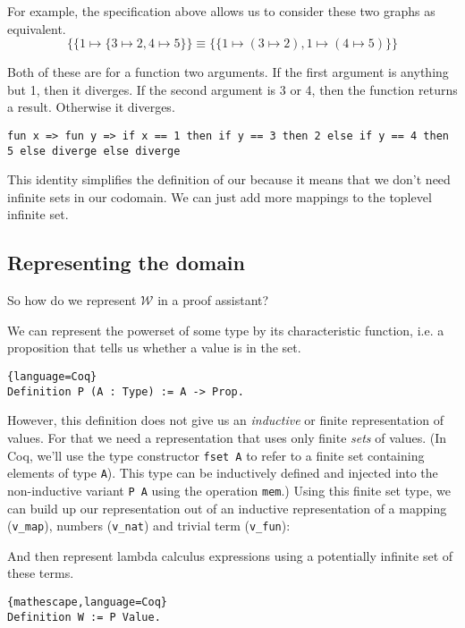 \documentclass{article}
\theoremstyle{definition}
\newcommand{\codeplus}[3]{%
  }
\begin{document}
For example, the specification above allows us to consider these two graphs as
equivalent. 
\[
\{ \{1 \mapsto \{ 3 \mapsto 2, 4 \mapsto 5 \} \}
\equiv
\{ \{ 1 \mapsto (3 \mapsto 2), 1 \mapsto (4 \mapsto 5) \} \}
\]

Both of these are for a function two arguments. If the first
argument is anything but 1, then it diverges. If the second argument is 3 or
4, then the function returns a result. Otherwise it diverges.

\begin{verbatim}
fun x => fun y => if x == 1 then if y == 3 then 2 else if y == 4 then 5 else diverge else diverge
\end{verbatim}


This identity simplifies the definition of our because it means that we don't
need infinite sets in our codomain. We can just add more mappings to the
toplevel infinite set.

\subsection{Representing the domain}

So how do we represent $\mathcal{W}$ in a proof assistant?

We can represent the powerset of some type by its characteristic function,
i.e. a proposition that tells us whether a value is in the set.

\begin{lstlisting}{language=Coq}
Definition P (A : Type) := A -> Prop.
\end{lstlisting}

However, this definition does not give us an \emph{inductive} or finite
representation of values. For that we need a representation that uses only
finite \emph{sets} of values. (In Coq, we'll use the type constructor
\texttt{fset A} to refer to a finite set containing elements of type
\texttt{A}). This type can be inductively defined and injected into the
non-inductive variant \texttt{P A} using the operation \texttt{mem}.) Using
this finite set type, we can build up our representation out of an inductive
representation of a mapping (\texttt{v\_map}), numbers (\texttt{v\_nat}) and
trivial term (\texttt{v\_fun}):

\codeplus{../coq/simple/model.v}{Value}{language=Coq}

And then represent lambda calculus expressions using a potentially infinite
set of these terms.

\begin{lstlisting}{mathescape,language=Coq}
Definition W := P Value.
\end{lstlisting}
\end{document}

